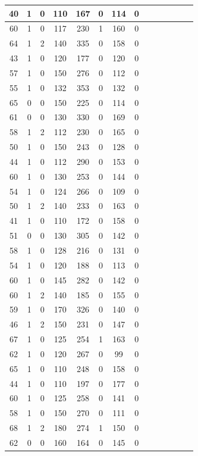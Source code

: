 \documentclass{article}
\begin{document}
\begin{center}
\begin{longtable}{|c|c|c|c|c|c|c|c|c|c|c|c|c|c|}
\hline
40 & 1 & 0 & 110 & 167 & 0 & 114 & 0 \\
\hline
60 & 1 & 0 & 117 & 230 & 1 & 160 & 0 \\
\hline
64 & 1 & 2 & 140 & 335 & 0 & 158 & 0 \\
\hline
43 & 1 & 0 & 120 & 177 & 0 & 120 & 0 \\
\hline
57 & 1 & 0 & 150 & 276 & 0 & 112 & 0 \\
\hline
55 & 1 & 0 & 132 & 353 & 0 & 132 & 0 \\
\hline
65 & 0 & 0 & 150 & 225 & 0 & 114 & 0 \\
\hline
61 & 0 & 0 & 130 & 330 & 0 & 169 & 0 \\
\hline
58 & 1 & 2 & 112 & 230 & 0 & 165 & 0 \\
\hline
50 & 1 & 0 & 150 & 243 & 0 & 128 & 0 \\
\hline
44 & 1 & 0 & 112 & 290 & 0 & 153 & 0 \\
\hline
60 & 1 & 0 & 130 & 253 & 0 & 144 & 0 \\
\hline
54 & 1 & 0 & 124 & 266 & 0 & 109 & 0 \\
\hline
50 & 1 & 2 & 140 & 233 & 0 & 163 & 0 \\
\hline
41 & 1 & 0 & 110 & 172 & 0 & 158 & 0 \\
\hline
51 & 0 & 0 & 130 & 305 & 0 & 142 & 0 \\
\hline
58 & 1 & 0 & 128 & 216 & 0 & 131 & 0 \\
\hline
54 & 1 & 0 & 120 & 188 & 0 & 113 & 0 \\
\hline
60 & 1 & 0 & 145 & 282 & 0 & 142 & 0 \\
\hline
60 & 1 & 2 & 140 & 185 & 0 & 155 & 0 \\
\hline
59 & 1 & 0 & 170 & 326 & 0 & 140 & 0 \\
\hline
46 & 1 & 2 & 150 & 231 & 0 & 147 & 0 \\
\hline
67 & 1 & 0 & 125 & 254 & 1 & 163 & 0 \\
\hline
62 & 1 & 0 & 120 & 267 & 0 & 99 & 0 \\
\hline
65 & 1 & 0 & 110 & 248 & 0 & 158 & 0 \\
\hline
44 & 1 & 0 & 110 & 197 & 0 & 177 & 0 \\
\hline
60 & 1 & 0 & 125 & 258 & 0 & 141 & 0 \\
\hline
58 & 1 & 0 & 150 & 270 & 0 & 111 & 0 \\
\hline
68 & 1 & 2 & 180 & 274 & 1 & 150 & 0 \\
\hline
62 & 0 & 0 & 160 & 164 & 0 & 145 & 0 \\

\end{longtable}
\end{center}
\end{document}

